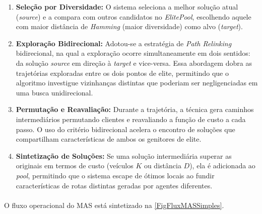 \begin{enumerate}
    \item \textbf{Seleção por Diversidade:} O sistema seleciona a melhor solução atual (\textit{source}) e a compara com outros candidatos no \textit{ElitePool}, escolhendo aquele com maior distância de \textit{Hamming} (maior diversidade) como alvo (\textit{target}).
    \item \textbf{Exploração Bidirecional:} Adotou-se a estratégia de \textit{Path Relinking} bidirecional, na qual a exploração ocorre simultaneamente em dois sentidos: da solução \textit{source} em direção à \textit{target} e vice-versa. Essa abordagem dobra as trajetórias exploradas entre os dois pontos de elite, permitindo que o algoritmo investigue vizinhanças distintas que poderiam ser negligenciadas em uma busca unidirecional.
    \item \textbf{Permutação e Reavaliação:} Durante a trajetória, a técnica gera caminhos intermediários permutando clientes e reavaliando a função de custo a cada passo. O uso do critério bidirecional acelera o encontro de soluções que compartilham características de ambos os genitores de elite.
    \item \textbf{Sintetização de Soluções:} Se uma solução intermediária superar as originais em termos de custo (veículos $K$ ou distância $D$), ela é adicionada ao \textit{pool}, permitindo que o sistema escape de ótimos locais ao fundir características de rotas distintas geradas por agentes diferentes.
\end{enumerate}

\paragraph{} O fluxo operacional do MAS está sintetizado na \autoref{FigFluxMASSimples}.

